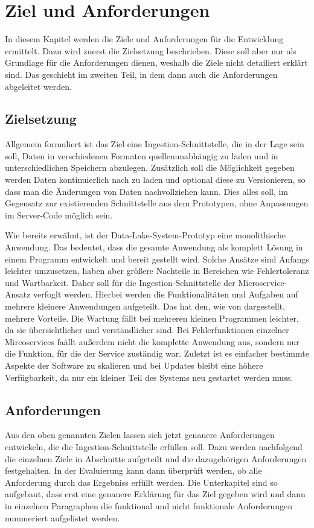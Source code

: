 \chapter{Ziel und Anforderungen}
In diesem Kapitel werden die Ziele und Anforderungen für die Entwicklung ermittelt.
Dazu wird zuerst die Zielsetzung beschrieben.
Diese soll aber nur als Grundlage für die Anforderungen dienen, weshalb die Ziele nicht detailiert erklärt sind.
Das geschieht im zweiten Teil, in dem dann auch die Anforderungen abgeleitet werden.

\section{Zielsetzung}
Allgemein formuliert ist das Ziel eine Ingestion-Schnittstelle, die in der Lage sein soll, Daten in verschiedenen Formaten quellenunabhängig zu laden und in unterschiedlichen Speichern abzulegen.
Zusätzlich soll die Möglichkeit gegeben werden Daten kontinuierlich nach zu laden und optional diese zu Versionieren, so dass man die Änderungen von Daten nachvollziehen kann.
Dies alles soll, im Gegensatz zur existierenden Schnittstelle aus dem Prototypen, ohne Anpassungen im Server-Code möglich sein.

Wie bereits erwähnt, ist der Data-Lake-System-Prototyp eine monolithische Anwendung.
Das bedeutet, dass die gesamte Anwendung als komplett Lösung in einem Programm entwickelt und bereit gestellt wird.
Solche Ansätze sind Anfangs leichter umzusetzen, haben aber größere Nachteile in Bereichen wie Fehlertoleranz und Wartbarkeit.
Daher soll für die Ingestion-Schnittstelle der Microservice-Ansatz verfoglt werden.
Hierbei werden die Funktionalitäten und Aufgaben auf mehrere kleinere Anwendungen aufgeteilt.
Das hat den, wie von \textcite{microservices} dargestellt, mehrere Vorteile.
Die Wartung fällt bei mehreren kleinen Programmen leichter, da sie übersichtlicher und verständlicher sind.
Bei Fehlerfunktionen einzelner Mircoservices faällt außerdem nicht die komplette Anwendung aus, sondern nur die Funktion, für die der Service zuständig war.
Zuletzt ist es einfacher bestimmte Aspekte der Software zu skalieren und bei Updates bleibt eine höhere Verfügbarkeit, da nur ein kleiner Teil des Systems neu gestartet werden muss.

\section{Anforderungen}
Aus den oben genannten Zielen lassen sich jetzt genauere Anforderungen entwickeln, die die Ingestion-Schnittstelle erfüllen soll.
Dazu werden nachfolgend die einzelnen Ziele in Abschnitte aufgeteilt und die dazugehörigen Anforderungen festgehalten.
In der Evaluierung kann dann überprüft werden, ob alle Anforderung durch das Ergebniss erfüllt werden.
Die Unterkapitel sind so aufgebaut, dass erst eine genauere Erklärung für das Ziel gegeben wird und dann in einzelnen Paragraphen die funktional und nicht funktionale Anforderungen nummeriert aufgelistet werden.

